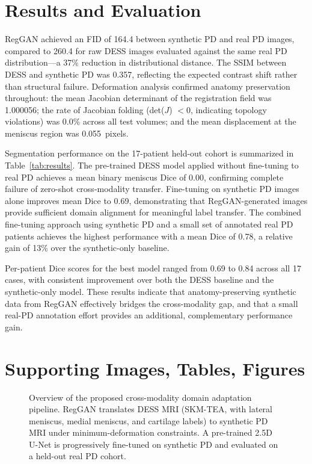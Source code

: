 \documentclass[12pt, a4paper]{article}
\begin{document}
\section{Results and Evaluation}

RegGAN achieved an FID of 164.4 between synthetic PD and real PD images, compared to 260.4 for raw DESS images evaluated against the same real PD distribution—a 37\% reduction in distributional distance. The SSIM between DESS and synthetic PD was 0.357, reflecting the expected contrast shift rather than structural failure. Deformation analysis confirmed anatomy preservation throughout: the mean Jacobian determinant of the registration field was 1.000056; the rate of Jacobian folding (det($J$) $< 0$, indicating topology violations) was 0.0\% across all test volumes; and the mean displacement at the meniscus region was 0.055~pixels.

Segmentation performance on the 17-patient held-out cohort is summarized in Table~\ref{tab:results}. The pre-trained DESS model applied without fine-tuning to real PD achieves a mean binary meniscus Dice of 0.00, confirming complete failure of zero-shot cross-modality transfer. Fine-tuning on synthetic PD images alone improves mean Dice to 0.69, demonstrating that RegGAN-generated images provide sufficient domain alignment for meaningful label transfer. The combined fine-tuning approach using synthetic PD and a small set of annotated real PD patients achieves the highest performance with a mean Dice of 0.78, a relative gain of 13\% over the synthetic-only baseline.

Per-patient Dice scores for the best model ranged from 0.69 to 0.84 across all 17 cases, with consistent improvement over both the DESS baseline and the synthetic-only model. These results indicate that anatomy-preserving synthetic data from RegGAN effectively bridges the cross-modality gap, and that a small real-PD annotation effort provides an additional, complementary performance gain.

\section{Supporting Images, Tables, Figures}

\begin{figure}[h]
    \centering
    \caption{Overview of the proposed cross-modality domain adaptation pipeline. RegGAN translates DESS MRI (SKM-TEA, with lateral meniscus, medial meniscus, and cartilage labels) to synthetic PD MRI under minimum-deformation constraints. A pre-trained 2.5D U-Net is progressively fine-tuned on synthetic PD and evaluated on a held-out real PD cohort.}
    \label{fig:pipeline}
\end{figure}
\end{document}
